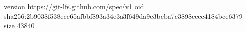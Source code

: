 version https://git-lfs.github.com/spec/v1
oid sha256:2b9038f538ece65afbbf893a34e3a3f649da9e3bcba7c3898cecc4184bce6379
size 43840
